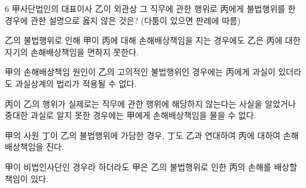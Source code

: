 \begin{question}{6}
甲사단법인의 대표이사 乙이 외관상 그 직무에 관한 행위로 丙에게 불법행위를 한 경우에 관한 설명으로 옳지 않은 것은? (다툼이 있으면 판례에 따름)
\begin{choices}
  \item 乙의 불법행위로 인해 甲이 丙에 대해 손해배상책임을 지는 경우에도 乙은 丙에 대한 자기의 손해배상책임을 면하지 못한다.
  \item 甲의 손해배상책임 원인이 乙의 고의적인 불법행위인 경우에는 丙에게 과실이 있더라도 과실상계의 법리가 적용될 수 없다.
  \item 丙이 乙의 행위가 실제로는 직무에 관한 행위에 해당하지 않는다는 사실을 알았거나 중대한 과실로 알지 못한 경우에는 甲에게 손해배상책임을 물을 수 없다.
  \item 甲의 사원 丁이 乙의 불법행위에 가담한 경우, 丁도 乙과 연대하여 丙에 대하여 손해배상책임을 진다.
  \item 甲이 비법인사단인 경우라 하더라도 甲은 乙의 불법행위로 인한 丙의 손해를 배상할 책임이 있다.
\end{choices}
\end{question}
